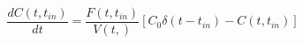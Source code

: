 \begin{equation}
\frac{dC(t,t_{in})}{dt} = \frac{F(t,t_{in})}{V(t,)}[C_0\delta(t-t_{in})-C(t,t_{in})]
\end{equation}